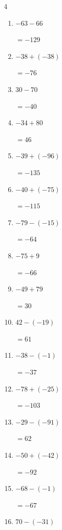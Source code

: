 \begin{multicols}{4}
\begin{enumerate}
        $=109$

  \item $-63-66$

        $=-129$

  \item $-38+(-38)$

        $=-76$

  \item $30-70$

        $=-40$

  \item $-34+80$

        $=46$

\columnbreak %

\resetques

  \item $-39+(-96)$

        $=-135$

  \item $-40+(-75)$

        $=-115$

  \item $-79-(-15)$

        $=-64$

  \item $-75+9$

        $=-66$

  \item $-49+79$

        $=30$

  \item $42-(-19)$

        $=61$

  \item $-38-(-1)$

        $=-37$

  \item $-78+(-25)$

        $=-103$

  \item $-29-(-91)$

        $=62$

  \item $-50+(-42)$

        $=-92$

  \item $-68-(-1)$

        $=-67$

  \item $70-(-31)$


\end{enumerate}
\end{multicols}
